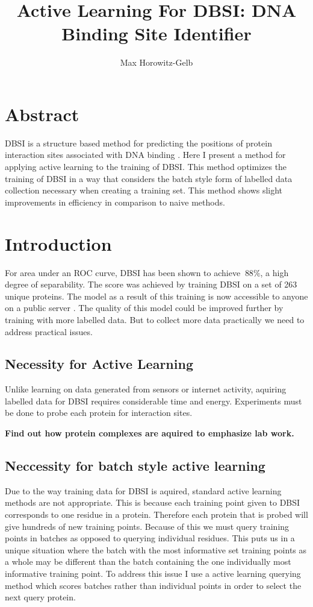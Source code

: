 \documentclass{article}
\begin{document}
\author{Max Horowitz-Gelb}
\title{Active Learning For DBSI: DNA Binding Site Identifier }
\maketitle

\section*{Abstract}
DBSI is a structure based method for predicting the positions of protein interaction sites associated with DNA binding \cite{dbsi}. Here I present a method for applying active learning to the training of DBSI. This method optimizes the training of DBSI in a way that considers the batch style form of labelled data collection necessary when creating a training set. This method shows slight improvements in efficiency in comparison to naive methods. 
\section*{Introduction}
For area under an ROC curve, DBSI has been shown to achieve $~88\%$, a high degree of separability. The score was achieved by training DBSI on a set of 263 unique proteins. The model as a result of this training is now accessible to anyone on a public server \cite{dbsi_server}. The quality of this model could be improved further by training with more labelled data. But to collect more data practically we need to address practical issues.
\subsection*{Necessity for Active Learning}
Unlike learning on data generated from sensors or internet activity, aquiring labelled data for DBSI requires considerable time and energy. Experiments must be done to probe each protein for interaction sites.

\textbf{Find out how protein complexes are aquired to emphasize lab work.}

\subsection*{Neccessity for batch style active learning}
Due to the way training data for DBSI is aquired, standard active learning methods are not appropriate. This is because each training point given to DBSI corresponds to one residue in a protein. Therefore each protein that is probed will give hundreds of new training points. Because of this we must query training points in batches as opposed to querying individual residues. This puts us in a unique situation where the batch with the most informative set training points as a whole may be different than the batch containing the one individually most informative training point. To address this issue I use a active learning querying method which scores batches rather than individual points in order to select the next query protein.
\end{document}

